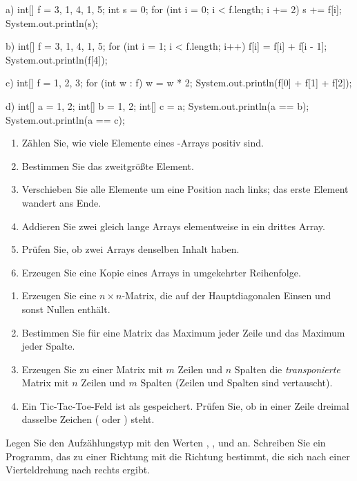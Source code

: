\begin{tcbraster}[raster columns=2, raster equal height=rows, raster column skip=3mm, raster row skip=1mm]
\begin{javacode}[Ausschnitt]{a)}
int[] f = {3, 1, 4, 1, 5};
int s = 0;
for (int i = 0; i < f.length; i += 2) {
	s += f[i];
}
System.out.println(s);
\end{javacode}
\begin{javacode}[Ausschnitt]{b)}
int[] f = {3, 1, 4, 1, 5};
for (int i = 1; i < f.length; i++) {
	f[i] = f[i] + f[i - 1];
}
System.out.println(f[4]);
\end{javacode}
\begin{javacode}[Ausschnitt]{c)}
int[] f = {1, 2, 3};
for (int w : f) {
	w = w * 2;
}
System.out.println(f[0] + f[1] + f[2]);
\end{javacode}
\begin{javacode}[Ausschnitt]{d)}
int[] a = {1, 2};
int[] b = {1, 2};
int[] c = a;
System.out.println(a == b);
System.out.println(a == c);
\end{javacode}
\end{tcbraster}

\begin{enumerate}[label=\alph*)]
\item Zählen Sie, wie viele Elemente eines -Arrays positiv sind.
\item Bestimmen Sie das zweitgrößte Element.
\item Verschieben Sie alle Elemente um eine Position nach links; das erste Element wandert ans Ende.
\item Addieren Sie zwei gleich lange Arrays elementweise in ein drittes Array.
\item Prüfen Sie, ob zwei Arrays denselben Inhalt haben.
\item Erzeugen Sie eine Kopie eines Arrays in umgekehrter Reihenfolge.
\end{enumerate}

\begin{enumerate}[label=\alph*)]
\item Erzeugen Sie eine $n \times n$-Matrix, die auf der Hauptdiagonalen Einsen und sonst Nullen enthält.
\item Bestimmen Sie für eine Matrix das Maximum jeder Zeile und das Maximum jeder Spalte.
\item Erzeugen Sie zu einer Matrix mit $m$ Zeilen und $n$ Spalten die \emph{transponierte} Matrix mit $n$ Zeilen und $m$ Spalten (Zeilen und Spalten sind vertauscht).
\item Ein Tic-Tac-Toe-Feld ist als  gespeichert. Prüfen Sie, ob in einer Zeile dreimal dasselbe Zeichen ( oder ) steht.
\end{enumerate}

Legen Sie den Aufzählungstyp  mit den Werten , ,  und  an. Schreiben Sie ein Programm, das zu einer Richtung mit  die Richtung bestimmt, die sich nach einer Vierteldrehung nach rechts ergibt.
